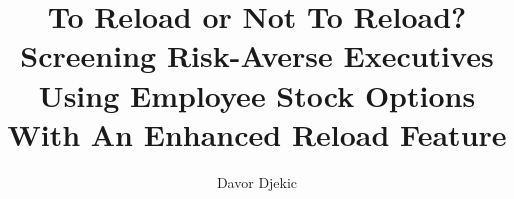 \documentclass[12pt]{article}
\title{To Reload or Not To Reload?\\ Screening Risk-Averse Executives Using Employee Stock Options With An Enhanced Reload Feature}
\author{Davor Djekic}
\begin{document}
    \maketitle
    \newpage

    \tableofcontents


    
    
    
    
    
    

    \listoffigures
    \listoftables
    \newpage
  
    \nocite{*}
    \printbibliography

\end{document}
